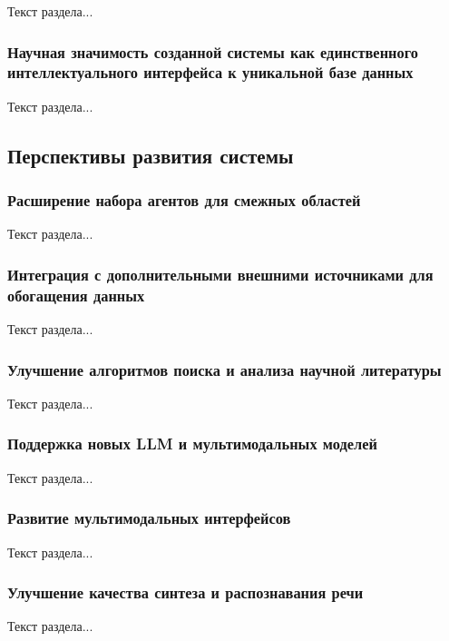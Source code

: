Текст раздела...

\subsubsection{Научная значимость созданной системы как единственного интеллектуального интерфейса к уникальной базе данных}

Текст раздела...

\subsection{Перспективы развития системы}

\subsubsection{Расширение набора агентов для смежных областей}

Текст раздела...

\subsubsection{Интеграция с дополнительными внешними источниками для обогащения данных}

Текст раздела...

\subsubsection{Улучшение алгоритмов поиска и анализа научной литературы}

Текст раздела...

\subsubsection{Поддержка новых LLM и мультимодальных моделей}

Текст раздела...

\subsubsection{Развитие мультимодальных интерфейсов}

Текст раздела...

\subsubsection{Улучшение качества синтеза и распознавания речи}

Текст раздела...

